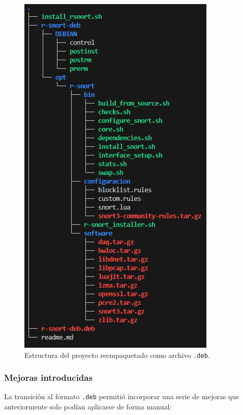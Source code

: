 \documentclass[11pt,a4paper,twoside]{report}
\begin{document}
\begin{figure}[H]
	\centering
	\includegraphics[scale=0.8]{script_automatico/13.png}
	\caption{Estructura del proyecto reempaquetado como archivo \texttt{.deb}.}
\end{figure}

\subsubsection{Mejoras introducidas}

La transición al formato \texttt{.deb} permitió incorporar una serie de mejoras que anteriormente solo podían aplicarse de forma manual:
\end{document}
